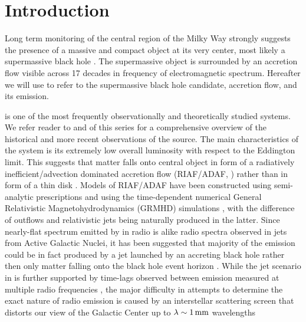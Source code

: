 \section{Introduction}
\label{sec:intro}

Long term monitoring of the central region of the Milky Way strongly suggests the presence of a massive and compact object at its very center, most likely a supermassive black hole \citep{2019Sci...365..664D, 2019A&A...625L..10G}.
The supermassive object is surrounded by an accretion flow visible across 17 decades in frequency of electromagnetic spectrum.
Hereafter we will use \sgra to refer to the supermassive black hole candidate, accretion flow, and its emission.

\sgra is one of the most frequently observationally and theoretically studied systems.
We refer reader to  and  of this series for a comprehensive overview of the historical and more recent observations of the source.
The main characteristics of the \sgra system is its extremely low overall luminosity with respect to the Eddington limit.
This suggests that matter falls onto \sgra central object in form of a radiatively inefficient/advection dominated accretion flow (RIAF/ADAF, \citealt{1977ApJ...214..840I,1994ApJ...428L..13N, 1995ApJ...444..231N, 1995ApJ...452..710N, 1996A&AS..120C.287N, 1998ApJ...492..554N,2014ARA&A..52..529Y}) rather than in form of a thin disk \citep{1973A&A....24..337S}.
Models of RIAF/ADAF have been constructed using semi-analytic prescriptions \citep[e.g.,][]{1995Natur.374..623N,2000ApJ...541..234O, 2009ApJ...697...45B,2011ApJ...735..110B} and using the time-dependent numerical General Relativistic Magnetohydrodynamics (GRMHD) simulations \citep[e.g.,][]{2000ApJ...528..462H, 2003ApJ...589..458D, 2003ApJ...589..444G, 2007CQGra..24S.235G, 2012ApJS..201....9F, 2014ApJ...796...22F, 2016ApJS..225...22W, 2017ApJS..231...17A, 2018JPhCS1031a2008O, 2019A&A...629A..61O, 2019ApJS..243...26P}, with the difference of outflows and relativistic jets being naturally produced in the latter.
Since nearly-flat spectrum emitted by \sgra in radio is alike radio spectra observed in jets from Active Galactic Nuclei, it has been suggested that majority of the \sgra emission could be in fact produced by a jet launched by an accreting black hole rather then only matter falling onto the black hole event horizon \citep{2000A&A...362..113F}.
While the jet scenario in \sgra is further supported by time-lags observed between emission measured at multiple radio frequencies \citep{2021arXiv210713402B}, the major difficulty in attempts to determine the exact nature of \sgra radio emission is caused by an interstellar scattering screen that distorts our view of the Galactic Center up to $\lambda \sim 1\,\mathrm{mm}$ wavelengths
